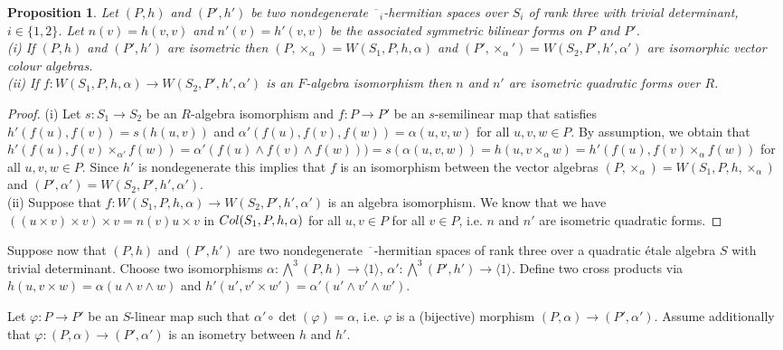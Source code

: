\documentclass[10pt]{amsart}
\theoremstyle{plain}
\newtheorem{proposition}[theorem]{Proposition}
\theoremstyle{definition}
\newcommand{\can}{\overline{\phantom{x}}}
\begin{document}
  \begin{proposition}\label{prop:2.5}
  Let $(P,h)$ and $(P',h')$ be two nondegenerate $\can_i$-hermitian spaces over $S_i$ of rank three with trivial determinant, $i\in \{1,2\}$.
  Let $n(v)=h(v,v)$ and $n'(v)=h'(v,v)$ be the associated symmetric bilinear forms on $P$ and $P'$.
  \\
 (i) If $(P,h)$ and $(P',h')$ are isometric  then  $(P,\times_\alpha)=W(S_1,P,h,\alpha)$ and $(P',\times_\alpha')=W(S_2,P',h',\alpha')$ are isomorphic vector colour algebras.
 \\ (ii) If $f:W(S_1,P,h,\alpha)\rightarrow W(S_2,P',h',\alpha')$ is an $F$-algebra isomorphism then $n$ and $n'$ are isometric quadratic forms over $R$.
  \end{proposition}

  \begin{proof}
  (i) Let  $s:S_1\rightarrow S_2$ be an $R$-algebra isomorphism and  $f:P\rightarrow P'$ be an $s$-semilinear map that satisfies
 $h'(f(u),f(v))=s(h(u,v))$ and $\alpha'(f(u),f(v),f(w))=\alpha(u,v,w)$ for all $u,v,w\in P$.
  By assumption, we obtain that
 $h'(f(u),f(v)\times_{\alpha'} f(w))=\alpha'(f(u)\wedge f(v) \wedge f(w)))=s(\alpha(u,v,w))=h(u,v\times_\alpha w)=h'(f(u),f(v) \times_\alpha f(w))$
 for all $u,v,w\in P$.  Since $h'$ is nondegenerate this implies that $f$ is an isomorphism between the vector algebras $(P,\times_\alpha)=W(S_1,P,h,\times_\alpha)$ and $(P',\alpha')=W(S_2,P',h',\alpha')$.
 \\ (ii) Suppose that $f:W(S_1,P,h,\alpha)\rightarrow W(S_2,P',h',\alpha')$ is an algebra isomorphism.
 We know that we have
 $((u\times v)\times v)\times v=n(v) u\times v$ in ${\rm Col}(S_1,P,h,\alpha)$ for all $u,v\in P$ \cite[Lemma 2]{Pu2}
 for all $v\in P$, i.e. $n$ and $n'$ are isometric quadratic forms.
  \end{proof}

Suppose now that $(P,h)$ and $(P',h')$ are two nondegenerate $\can$-hermitian spaces  of rank three  over a quadratic \'etale algebra $S$ with trivial determinant.
Choose two isomorphisms $\alpha: \bigwedge^3 (P,h)\rightarrow \langle 1\rangle $, $\alpha': \bigwedge^3 (P',h')\rightarrow \langle 1\rangle $.
Define two cross products
via $h(u,v\times w)=\alpha(u\wedge v \wedge w)$ and
$h'(u',v'\times w')=\alpha'(u'\wedge v' \wedge w').$

Let $\varphi: P\rightarrow P' $ be an $S$-linear map  such that $\alpha'\circ \det (\varphi)=\alpha$, i.e. $\varphi$ is a (bijective) morphism
 $ (P,\alpha)\rightarrow (P',\alpha') $.
   Assume additionally that $\varphi: (P,\alpha)\rightarrow (P',\alpha') $ is an isometry between $h$ and $h'$.
\end{document}
